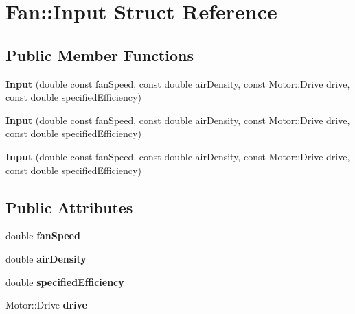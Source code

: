\hypertarget{struct_fan_1_1_input}{}\section{Fan\+:\+:Input Struct Reference}
\label{struct_fan_1_1_input}
\subsection*{Public Member Functions}
\begin{DoxyCompactItemize}
\item 
\mbox{\label{struct_fan_1_1_input_a50887956beaf366f18a34393f41f7157}} 
{\bfseries Input} (double const fan\+Speed, const double air\+Density, const Motor\+::\+Drive drive, const double specified\+Efficiency)
\item 
\mbox{\label{struct_fan_1_1_input_a50887956beaf366f18a34393f41f7157}} 
{\bfseries Input} (double const fan\+Speed, const double air\+Density, const Motor\+::\+Drive drive, const double specified\+Efficiency)
\item 
\mbox{\label{struct_fan_1_1_input_a50887956beaf366f18a34393f41f7157}} 
{\bfseries Input} (double const fan\+Speed, const double air\+Density, const Motor\+::\+Drive drive, const double specified\+Efficiency)
\end{DoxyCompactItemize}
\subsection*{Public Attributes}
\begin{DoxyCompactItemize}
\item 
\mbox{\label{struct_fan_1_1_input_aa31350b310c1b98f107d58ba365378d8}} 
double {\bfseries fan\+Speed}
\item 
\mbox{\label{struct_fan_1_1_input_a2a62a82803563bbc967bdba928cb60fc}} 
double {\bfseries air\+Density}
\item 
\mbox{\label{struct_fan_1_1_input_a378d6eb10478d4ce7dff657b3e526a3a}} 
double {\bfseries specified\+Efficiency}
\item 
\mbox{\label{struct_fan_1_1_input_a16334966d72198d8b3ede5d222480fc0}} 
Motor\+::\+Drive {\bfseries drive}
\end{DoxyCompactItemize}


